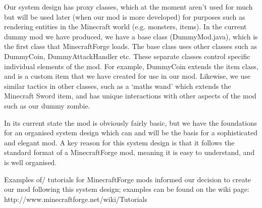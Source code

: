 Our system design has proxy classes, which at the moment aren’t used 
for much but will be used later (when our mod is more developed) for 
purposes such as rendering entities in the Minecraft world (e.g. monsters, items). 
In the current dummy mod we have produced, we have a base class (DummyMod.java), 
which is the first class that MinecraftForge loads. The base class uses other 
classes such as DummyCoin, DummyAttackHandler etc. These separate classes 
control specific individual elements of the mod. For example, DummyCoin extends 
the item class, and is a custom item that we have created for use in our mod. 
Likewise, we use similar tactics in other classes, such as a ‘maths wand’ 
which extends the Minecraft Sword item, and has unique interactions with other 
aspects of the mod such as our dummy zombie. 

In its current state the mod is obviously fairly basic, but we have the 
foundations for an organised system design which can and will be the basis 
for a sophisticated and elegant mod. A key reason for this system design 
is that it follows the standard format of a MinecraftForge mod, meaning it 
is easy to understand, and is well organised. 

Examples of/ tutorials for MinecraftForge mods informed our decision to 
create our mod following this system design; examples can be found on the 
wiki page: http://www.minecraftforge.net/wiki/Tutorials
